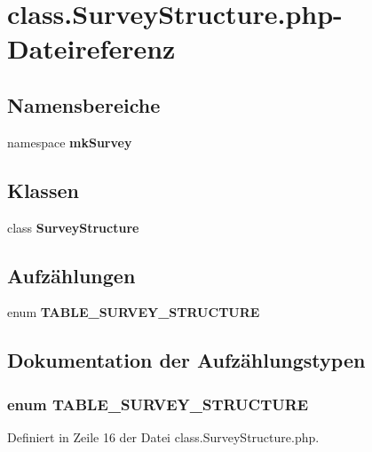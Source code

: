 \section{class.SurveyStructure.php-Dateireferenz}
\label{class_8SurveyStructure_8php}
\subsection*{Namensbereiche}
\begin{CompactItemize}
\item 
namespace {\bf mkSurvey}
\end{CompactItemize}
\subsection*{Klassen}
\begin{CompactItemize}
\item 
class {\bf SurveyStructure}
\end{CompactItemize}
\subsection*{Aufzählungen}
\begin{CompactItemize}
\item 
enum {\bf TABLE\_\-SURVEY\_\-STRUCTURE} 
\end{CompactItemize}


\subsection{Dokumentation der Aufzählungstypen}
\subsubsection{\setlength{\rightskip}{0pt plus 5cm}enum {\bf TABLE\_\-SURVEY\_\-STRUCTURE}}\label{class_8SurveyStructure_8php_d53db302df7d8d62fcde58360a5b6a22}




Definiert in Zeile 16 der Datei class.SurveyStructure.php.